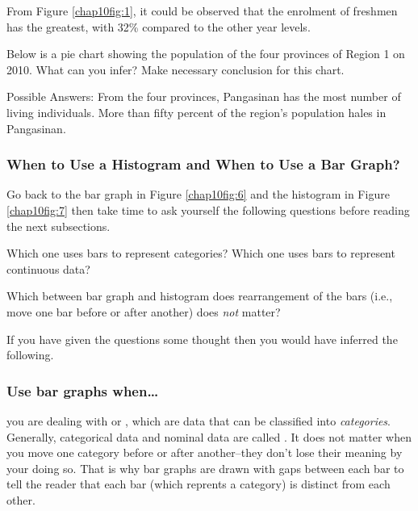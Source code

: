 \begin{example}
From Figure \eqref{chap10fig:1}, it could be observed that the enrolment of freshmen has the
greatest, with 32\% compared to the other year levels.

\item Below is a pie chart showing the population of the four
provinces of Region 1 on 2010. What can you infer? Make necessary
conclusion for this chart.

\begin{center}
\label{chap10fig:2}
\end{center}

\Solution

Possible Answers: From the four provinces, Pangasinan has the most number of living
individuals. More than fifty percent of the region's population hales in Pangasinan.
\end{example}

\subsubsection*{When to Use a Histogram and When to Use a Bar Graph?}
Go back to the bar graph in Figure \eqref{chap10fig:6} and the histogram in Figure \eqref{chap10fig:7} then take time to ask yourself the following questions before reading the next subsections.

\begin{myenumerate}
\item Which one uses bars to represent categories? Which one uses bars to represent continuous data?
\item Which between bar graph and histogram does rearrangement of the bars (i.e., move one bar before or after another) does \textit{not} matter?
\end{myenumerate}

If you have given the questions some thought then you would have inferred the following.
\subsubsection*{Use bar graphs when\ldots}
you are dealing with  or , which are data that can be classified into \textit{categories}. Generally, categorical data and nominal data are called . It does not matter when you move one category before or after another--they don't lose their meaning by your doing so. That is why bar graphs are drawn with gaps between each bar to tell the reader that each bar (which reprents a category) is distinct from each other.

